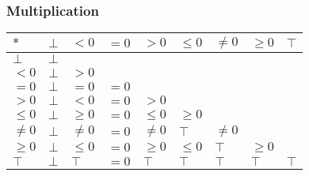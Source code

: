 \documentclass{beamer}
\begin{document}
    \begin{frame}
        \frametitle{Multiplication}
        \begin{table}[]
            \begin{tabular}{|l|l|l|l|l|l|l|l|l|}
            \hline
            $*$     & $\bot$ & $<0$    & $=0$ & $>0$    & $\le 0$ & $\ne 0$ & $\ge 0$ & $\top$ \\ \hline
            $\bot$  & $\bot$ &         &      &         &         &         &         &        \\ \hline
            $<0$    & $\bot$ & $>0$    &      &         &         &         &         &        \\ \hline
            $=0$    & $\bot$ & $=0$    & $=0$ &         &         &         &         &        \\ \hline
            $>0$    & $\bot$ & $<0$    & $=0$ & $>0$    &         &         &         &        \\ \hline
            $\le 0$ & $\bot$ & $\ge 0$ & $=0$ & $\le 0$ & $\ge 0$ &         &         &        \\ \hline
            $\ne 0$ & $\bot$ & $\ne 0$ & $=0$ & $\ne 0$ & $\top$  & $\ne 0$ &         &        \\ \hline
            $\ge 0$ & $\bot$ & $\le 0$ & $=0$ & $\ge 0$ & $\le 0$ & $\top$  & $\ge 0$ &        \\ \hline
            $\top$  & $\bot$ & $\top$  & $=0$ & $\top$  & $\top$  & $\top$  & $\top$  & $\top$ \\ \hline
            \end{tabular}
            \end{table}
        \end{frame}
\end{document}

